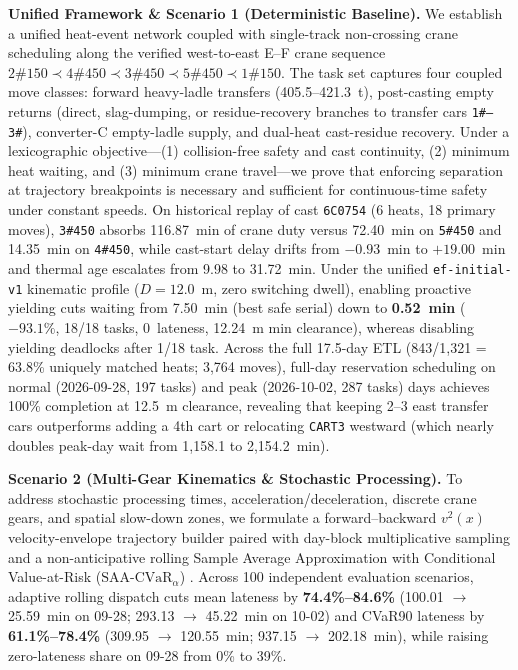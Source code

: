\documentclass[11pt,a4paper]{article}
\begin{document}
{\noindent\textbf{Unified Framework \& Scenario 1 (Deterministic Baseline).}
We establish a unified heat-event network coupled with single-track non-crossing crane scheduling along the verified west-to-east E--F crane sequence $\text{2\#150} \prec \text{4\#450} \prec \text{3\#450} \prec \text{5\#450} \prec \text{1\#150}$. The task set captures four coupled move classes: forward heavy-ladle transfers (405.5--421.3~t), post-casting empty returns (direct, slag-dumping, or residue-recovery branches to transfer cars \texttt{1\#--3\#}), converter-C empty-ladle supply, and dual-heat cast-residue recovery. Under a lexicographic objective---(1) collision-free safety and cast continuity, (2) minimum heat waiting, and (3) minimum crane travel---we prove that enforcing separation at trajectory breakpoints is necessary and sufficient for continuous-time safety under constant speeds. On historical replay of cast \texttt{6C0754} (6 heats, 18 primary moves), \texttt{3\#450} absorbs 116.87~min of crane duty versus 72.40~min on \texttt{5\#450} and 14.35~min on \texttt{4\#450}, while cast-start delay drifts from $-0.93$~min to $+19.00$~min and thermal age escalates from 9.98 to 31.72~min. Under the unified \texttt{ef-initial-v1} kinematic profile ($D=12.0$~m, zero switching dwell), enabling proactive yielding cuts waiting from 7.50~min (best safe serial) down to \textbf{0.52~min} (\textbf{$-93.1\%$}, 18/18 tasks, 0~lateness, 12.24~m min clearance), whereas disabling yielding deadlocks after 1/18 task. Across the full 17.5-day ETL (843/1,321 = 63.8\% uniquely matched heats; 3,764 moves), full-day reservation scheduling on normal (2026-09-28, 197 tasks) and peak (2026-10-02, 287 tasks) days achieves 100\% completion at 12.5~m clearance, revealing that keeping 2--3 east transfer cars outperforms adding a 4th cart or relocating \texttt{CART3} westward (which nearly doubles peak-day wait from 1,158.1 to 2,154.2~min).

\noindent\textbf{Scenario 2 (Multi-Gear Kinematics \& Stochastic Processing).}
To address stochastic processing times, acceleration/deceleration, discrete crane gears, and spatial slow-down zones, we formulate a forward--backward $v^2(x)$ velocity-envelope trajectory builder paired with day-block multiplicative sampling and a non-anticipative rolling Sample Average Approximation with Conditional Value-at-Risk ($\text{SAA-CVaR}_\alpha$) \cite{rockafellar2000optimization}. Across 100 independent evaluation scenarios, adaptive rolling dispatch cuts mean lateness by \textbf{74.4\%--84.6\%} (100.01 $\rightarrow$ 25.59~min on 09-28; 293.13 $\rightarrow$ 45.22~min on 10-02) and CVaR90 lateness by \textbf{61.1\%--78.4\%} (309.95 $\rightarrow$ 120.55~min; 937.15 $\rightarrow$ 202.18~min), while raising zero-lateness share on 09-28 from 0\% to 39\%.

}
\end{document}
